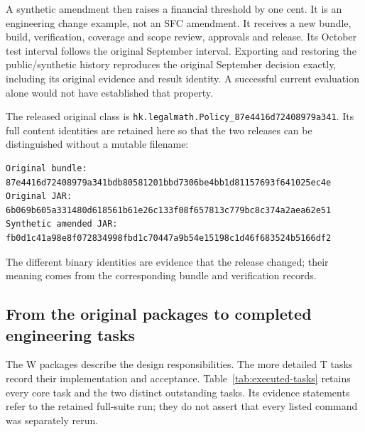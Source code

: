 A synthetic amendment then raises a financial threshold by one cent. It is an
engineering change example, not an SFC amendment. It receives a new bundle,
build, verification, coverage and scope review, approvals and release. Its
October test interval follows the original September interval. Exporting and
restoring the public/synthetic history reproduces the original September
decision exactly, including its original evidence and result identity. A
successful current evaluation alone would not have established that property.

The released original class is
\texttt{hk.legalmath.Policy\_87e4416d72408979a341}. Its full content identities
are retained here so that the two releases can be distinguished without a
mutable filename:
\begin{lstlisting}[caption={SHA-256 identities of the retained local walkthrough.}]
Original bundle:
87e4416d72408979a341bdb80581201bbd7306be4bb1d81157693f641025ec4e
Original JAR:
6b069b605a331480d618561b61e26c133f08f657813c779bc8c374a2aea62e51
Synthetic amended JAR:
fb0d1c41a98e8f072834998fbd1c70447a9b54e15198c1d46f683524b5166df2
\end{lstlisting}
The different binary identities are evidence that the release changed; their
meaning comes from the corresponding bundle and verification records.

\subsection{From the original packages to completed engineering tasks}

The W packages describe the design responsibilities. The more detailed T tasks
record their implementation and acceptance. Table~\ref{tab:executed-tasks}
retains every core task and the two distinct outstanding tasks. Its evidence
statements refer to the retained full-suite run; they do not assert that every
listed command was separately rerun.


